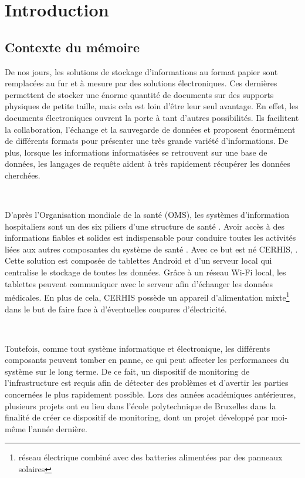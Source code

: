 \chapter{Introduction}
\section{Contexte du mémoire}

\noindent
De nos jours, les solutions de stockage d'informations au format papier sont remplacées au fur et à mesure par des solutions électroniques. Ces dernières permettent de stocker une énorme quantité de documents sur des supports physiques de petite taille, mais cela est loin d'être leur seul avantage. En effet, les documents électroniques ouvrent la porte à tant d'autres possibilités. Ils facilitent la collaboration, l'échange et la sauvegarde de données et proposent énormément de différents formats pour présenter une très grande variété d'informations. De plus, lorsque les informations informatisées se retrouvent sur une base de données, les langages de requête aident à très rapidement récupérer les données cherchées.

~

\noindent
D'après l'Organisation mondiale de la santé (OMS), les systèmes d'information hospitaliers sont un des six piliers d'une structure de santé \cite{world2010monitoring}. Avoir accès à des informations fiables et solides est indispensable pour conduire toutes les activités liées aux autres composantes du système de santé \cite{Mutale2013}. Avec ce but est né CERHIS, . Cette solution est composée de tablettes Android et d'un serveur local qui centralise le stockage de toutes les données. Grâce à un réseau Wi-Fi local, les tablettes peuvent communiquer avec le serveur afin d'échanger les données médicales. En plus de cela, CERHIS possède un appareil d'alimentation mixte\footnote{réseau électrique combiné avec des batteries alimentées par des panneaux solaires} dans le but de faire face à d'éventuelles coupures d'électricité.


~


\noindent
Toutefois, comme tout système informatique et électronique, les différents composants peuvent tomber en panne, ce qui peut affecter les performances du système sur le long terme. De ce fait, un dispositif de monitoring de l'infrastructure est requis afin de détecter des problèmes et d'avertir les parties concernées le plus rapidement possible. Lors des années académiques antérieures, plusieurs projets ont eu lieu dans l'école polytechnique de Bruxelles dans la finalité de créer ce dispositif de monitoring, dont un projet développé par moi-même l'année dernière.

